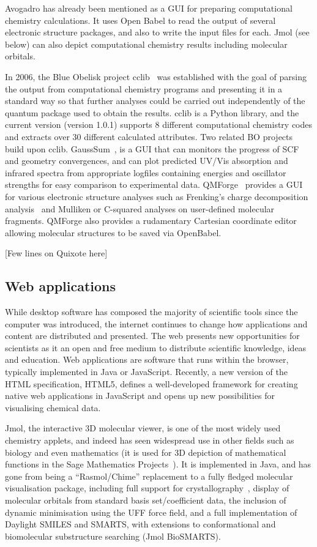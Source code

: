 \documentclass[10pt]{bmc_article}
\newenvironment{bmcformat}{\fussy\setboolean{publ}{true}}{\fussy}
\begin{document}
\begin{bmcformat}
Avogadro has already been mentioned as a GUI for preparing
computational chemistry calculations. It uses Open Babel to read the
output of several electronic structure packages, and also to write the
input files for each. Jmol (see below) can also depict computational
chemistry results including molecular orbitals.

In 2006, the Blue Obelisk project cclib~\cite{cclib} was established
with the goal of parsing the output from computational chemistry
programs and presenting it in a standard way so that further analyses
could be carried out independently of the quantum package used to
obtain the results. cclib is a Python library, and
the current version (version 1.0.1)
supports 8 different computational chemistry codes and extracts over
30 different calculated attributes. Two related BO projects build upon 
cclib. GaussSum~\cite{WebGaussSum},
is a GUI that can monitors the progress of SCF and geometry convergences, 
and can plot predicted UV/Vis absorption and infrared spectra from 
appropriate logfiles containing energies and oscillator strengths for easy 
comparison to experimental data. QMForge~\cite{WebQMForge} provides 
a GUI for various electronic structure analyses such as Frenking's charge 
decomposition analysis~\cite{Frenking} and Mulliken or C-squared analyses
on user-defined molecular fragments. QMForge also provides a rudamentary
Cartesian coordinate editor allowing molecular structures to be saved via OpenBabel.

[Few lines on Quixote here]

\subsection*{Web applications}

While desktop software has composed the majority of scientific tools
since the computer was introduced, the internet continues to change
how applications and content are distributed and presented. The web
presents new opportunities for scientists as it
an open and free medium to distribute scientific knowledge, ideas and
education. Web applications are software that runs within the browser,
typically implemented in Java or JavaScript.
Recently, a new version of the HTML
specification, HTML5, defines a well-developed framework
for creating native web applications in JavaScript and opens up
new possibilities for visualising chemical data.

Jmol, the interactive 3D molecular viewer, is one of the most widely used
chemistry applets, and indeed has
seen widespread use in other fields such as biology and 
even mathematics (it is used for 3D depiction of mathematical
functions in the Sage Mathematics Projects~\cite{WebSage}). It is implemented
in Java, and has gone from being a ``Rasmol/Chime'' replacement to a fully fledged molecular
visualisation package, including full support for crystallography~\cite{Hanson2010},
display of molecular orbitals from standard basis set/coefficient data,
the inclusion of dynamic minimisation using the UFF force field, and
a full implementation of Daylight SMILES and SMARTS, with extensions to
conformational and biomolecular substructure searching (Jmol
BioSMARTS).


\end{bmcformat}
\end{document}
